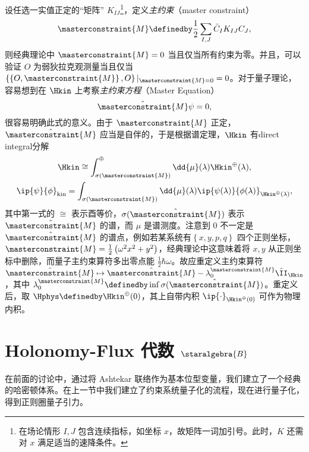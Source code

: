 			设任选一实值正定的“矩阵” $K_{IJ}$\footnote{在场论情形 $I,J$ 包含连续指标，如坐标 $x$，故矩阵一词加引号。此时，$K$ 还需对 $x$ 满足适当的速降条件。}，定义\emph{主约束}（master constraint）
			\begin{equation}
				\masterconstraint{M} \definedby \frac{1}{2} \sum_{I,J} \bar{C}_I K_{IJ} {C}_J,
			\end{equation}
			则经典理论中 $\masterconstraint{M}=0$ 当且仅当所有约束为零。并且，可以验证 $O$ 为弱狄拉克观测量当且仅当 $\left\{ \left\{ O, \masterconstraint{M} \right\}, O \right\} |_{\masterconstraint{M} = 0} =0$。对于量子理论，容易想到在 $\Hkin$ 上考察\emph{主约束方程}（Master Equation）
			\begin{equation}
				\hat{\masterconstraint{M}} \psi = 0,
			\end{equation}
			很容易明确此式的意义。由于 $\masterconstraint{M}$ 正定，$\hat{\masterconstraint{M}}$ 应当是自伴的，于是根据谱定理，$\Hkin$ 有direct integral分解
			\begin{equation}
				\begin{gathered}
					\Hkin \cong \int_{\sigma(\masterconstraint{M})}^{\oplus} \dd{\mu}(\lambda) \Hkin^\oplus(\lambda),\\
					\ip{\psi}{\phi}_{\text{kin}} = \int_{\sigma(\masterconstraint{M})} \dd{\mu}(\lambda) \ip{\psi(\lambda)}{\phi(\lambda)}_{\Hkin^\oplus(\lambda)},
				\end{gathered}
			\end{equation}
			其中第一式的 $\cong$ 表示酉等价，$\sigma(\hat{\masterconstraint{M}})$ 表示 $\hat{\masterconstraint{M}}$ 的谱，而 $\mu$ 是谱测度。注意到 $0$ 不一定是 $\hat{\masterconstraint{M}}$ 的谱点，例如若某系统有$\left\{ x,y,p,q \right\}$ 四个正则坐标，$\masterconstraint{M} = \frac{1}{2} \left( \omega^2 x^2+y^2 \right)$，经典理论中这意味着将 $x,y$ 从正则坐标中删除，而量子主约束算符多出零点能 $\frac{1}{2} \hbar \omega$。故应重定义主约束算符 $\hat{\masterconstraint{M}} \mapsto \hat{\masterconstraint{M}} - \lambda_0^{\masterconstraint{M}} \hat{\II}_{\Hkin}$，其中 $\lambda_0^{\masterconstraint{M}} \definedby \inf{\sigma(\hat{\masterconstraint{M}})}$。重定义后，取 $\Hphys \definedby \Hkin^\oplus(0)$，其上自带内积 $\ip{\cdot}_{\Hkin^{\oplus}(0)}$ 可作为物理内积。


	\section{\texorpdfstring{Holonomy-Flux 代数 $\staralgebra{B}$}{Holonomy-Flux 代数 B}}

		在前面的讨论中，通过将 Ashtekar 联络作为基本位型变量，我们建立了一个经典的哈密顿体系。在上一节中我们建立了约束系统量子化的流程，现在进行量子化，得到正则圈量子引力。

